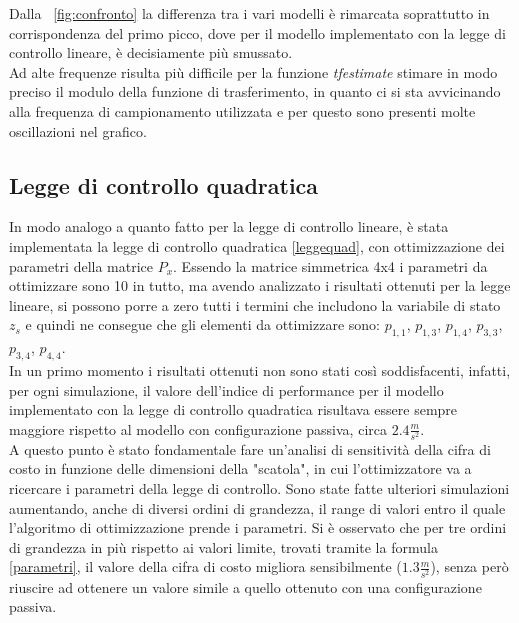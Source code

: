 Dalla \figurename \ \ref{fig:confronto} la differenza tra i vari modelli è rimarcata soprattutto in corrispondenza del primo picco, dove per il modello implementato con la legge di controllo lineare, è decisiamente più smussato.\\
Ad alte frequenze risulta più difficile per la funzione \textit{tfestimate} stimare in modo preciso il modulo della funzione di trasferimento, in quanto ci si sta avvicinando alla frequenza di campionamento utilizzata e per questo sono presenti molte oscillazioni nel grafico.


\subsection{Legge di controllo quadratica}
\label{quad}
In modo analogo a quanto fatto per la legge di controllo lineare, è stata implementata la legge di controllo quadratica \eqref{leggequad}, con ottimizzazione dei parametri della matrice $P_x$. Essendo la matrice simmetrica 4x4 i parametri da ottimizzare sono 10 in tutto, ma avendo analizzato i risultati ottenuti per la legge lineare, si possono porre a zero tutti i termini che includono la variabile di stato $z_s$ e quindi ne consegue che gli elementi da ottimizzare sono: $p_{1,1}$, $p_{1,3}$, $p_{1,4}$, $p_{3,3}$, $p_{3,4}$, $p_{4,4}$.\\
In un primo momento i risultati ottenuti non sono stati così soddisfacenti, infatti, per ogni simulazione, il valore dell'indice di performance per il modello implementato con la legge di controllo quadratica risultava essere sempre maggiore rispetto al modello con configurazione passiva, circa $2.4\frac{m}{s^2}$.\\
A questo punto è stato fondamentale fare un'analisi di sensitività della cifra di costo in funzione delle dimensioni della "scatola", in cui l'ottimizzatore va a ricercare i parametri della legge di controllo. Sono state fatte ulteriori simulazioni aumentando, anche di diversi ordini di grandezza, il range di valori entro il quale l'algoritmo di ottimizzazione prende i parametri. Si è osservato che per tre ordini di grandezza in più rispetto ai valori limite, trovati tramite la formula \eqref{parametri}, il valore della cifra di costo migliora sensibilmente ($1.3\frac{m}{s^2}$), senza però riuscire ad ottenere un valore simile a quello ottenuto con una configurazione passiva.\\

